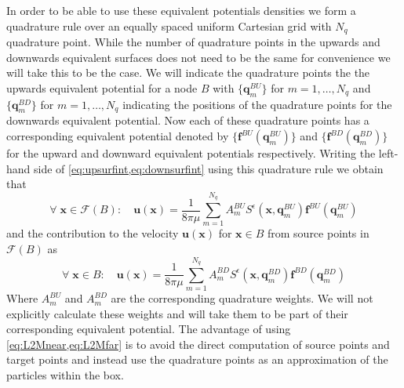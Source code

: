 In order to be able to use these equivalent potentials densities we form a quadrature rule over an equally spaced uniform Cartesian grid with $N_q$ quadrature point. While the number of quadrature points in the upwards and downwards equivalent surfaces does not need to be the same for convenience we will take this to be the case. We will indicate the quadrature points the the upwards equivalent potential for a node $B$ with $\{\mathbf{q}^{BU}_m\}$ for $m=1,\dots,N_q$ and $\{\mathbf{q}^{BD}_m\}$ for $m=1,\dots,N_q$ indicating the positions of the quadrature points for the downwards equivalent potential. Now each of these quadrature points has a corresponding equivalent potential denoted by $\{\mathbf{f}^{BU}(\mathbf{q}^{BU}_m)\}$ and $\{\mathbf{f}^{BD}(\mathbf{q}^{BD}_m)\}$ for the upward and downward equivalent potentials respectively. Writing the left-hand side of \cref{eq:upsurfint,eq:downsurfint} using this quadrature rule we obtain that
\begin{equation}
\label{eq:L2Mfar}
    \forall \;\mathbf{x} \in \mathcal{F}(B): \quad \mathbf{u}(\mathbf{x})= \frac{1}{8 \pi \mu} \sum_{m=1}^{N_{q}} A_{m}^{BU} S^\epsilon\left(\mathbf{x}, \mathbf{q}_{m}^{B U}\right) \mathbf{f}^{B U}\left(\mathbf{q}_{m}^{B U}\right)
\end{equation}
and the contribution to the velocity $\mathbf{u}(\mathbf{x})$ for $\mathbf{x} \in B$ from source points in $\mathcal{F}(B)$ as
\begin{equation}
\label{eq:L2Mnear}
    \forall \;\mathbf{x} \in B: \quad \mathbf{u}(\mathbf{x})= \frac{1}{8 \pi \mu} \sum_{m=1}^{N_{q}} A_{m}^{BD} S^\epsilon\left(\mathbf{x}, \mathbf{q}_{m}^{B D}\right) \mathbf{f}^{B D}\left(\mathbf{q}_{m}^{B D}\right)
\end{equation}
Where $A_{m}^{BU}$ and $A_{m}^{BD}$ are the corresponding quadrature weights. We will not explicitly calculate these weights and will take them to be part of their corresponding equivalent potential. The advantage of using \cref{eq:L2Mnear,eq:L2Mfar} is to avoid the direct computation of source points and target points and instead use the quadrature points as an approximation of the particles within the box.

